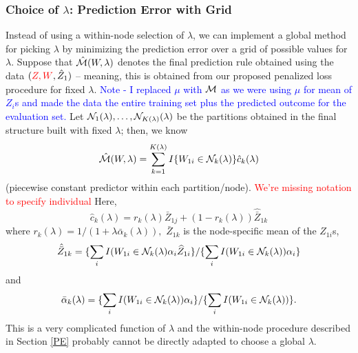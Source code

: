 \documentclass[12pt]{article}
\begin{document}





\subsubsection{Choice of $\lambda$: Prediction Error with Grid }
\label{PE-grid}

Instead of using a within-node selection of $\lambda$, we can implement a global
method for picking $\lambda$ by minimizing the prediction error over a grid of possible values for $\lambda$. 
Suppose that $\hat{\cal M}(W,\lambda)$ denotes the final prediction
rule obtained using the data $(\textcolor{red}{Z, W}, \hat Z_1)$ -- meaning, this is obtained from our proposed
penalized loss procedure for fixed $\lambda.$ \textcolor{blue}{Note - I replaced $\mu$ with $\cal M$ as we were using $\mu$ for mean of $Z_i$s and made the data the entire training set plus the predicted outcome for the evaluation set.}
Let ${\cal N}_1(\lambda), \ldots, {\cal N}_{K(\lambda)}(\lambda)$ be the
partitions obtained in the final structure built with fixed $\lambda$; 
then, we know
\[
\hat{\cal M}(W,\lambda) = \sum_{k=1}^{K(\lambda)} I\{W_{1i} \in {\cal
  N}_k(\lambda)\} \hat c_k(\lambda)
\]
(piecewise constant predictor within each partition/node). \textcolor{red}{We're missing notation to specify individual} Here,
 \[
\hat{c}_{k}(\lambda) =
r_{k}(\lambda) \bar{Z}_{1j} + (1-r_k(\lambda)) \hat{\bar{Z}}_{1k}
\]
where $r_k(\lambda) = 1/(1 + \lambda \bar{\alpha}_k(\lambda)),$ 
$\bar{Z}_{1k}$ is the node-specific mean
of the $Z_{1i}$s,
\[
\hat{\bar{Z}}_{1k}=
\{ \sum_i I(W_{1i} \in {\cal N}_k(\lambda) \alpha_i  \widehat{Z}_{1i}  \}
/ \{ \sum_i I(W_{1i} \in {\cal N}_k(\lambda)) \alpha_i \}
\]
and
\[
\bar{\alpha}_{k}(\lambda) =  \{ \sum_i I(W_{1i} \in  {\cal N}_k(\lambda)) \alpha_i \} /
\{ \sum_i I(W_{1i} \in  {\cal N}_k(\lambda))  \}. 
\]
This is a very complicated function of $\lambda$ and the within-node
procedure described in Section \ref{PE} probably cannot be directly
adapted to choose a global $\lambda$.
\end{document}
